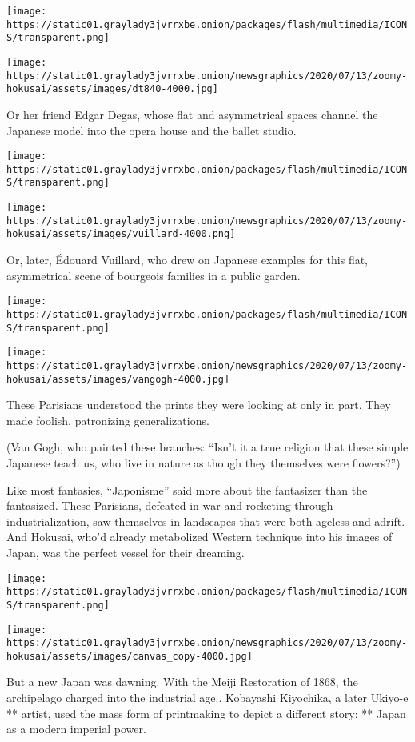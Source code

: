 \texttt{[image: https://static01.graylady3jvrrxbe.onion/packages/flash/multimedia/ICONS/transparent.png]}

\texttt{[image: https://static01.graylady3jvrrxbe.onion/newsgraphics/2020/07/13/zoomy-hokusai/assets/images/dt840-4000.jpg]}

Or her friend Edgar Degas, whose flat and asymmetrical spaces channel
the Japanese model into the opera house and the ballet studio.

\texttt{[image: https://static01.graylady3jvrrxbe.onion/packages/flash/multimedia/ICONS/transparent.png]}

\texttt{[image: https://static01.graylady3jvrrxbe.onion/newsgraphics/2020/07/13/zoomy-hokusai/assets/images/vuillard-4000.png]}

Or, later, Édouard Vuillard, who drew on Japanese examples for this
flat, asymmetrical scene of bourgeois families in a public garden.

\texttt{[image: https://static01.graylady3jvrrxbe.onion/packages/flash/multimedia/ICONS/transparent.png]}

\texttt{[image: https://static01.graylady3jvrrxbe.onion/newsgraphics/2020/07/13/zoomy-hokusai/assets/images/vangogh-4000.jpg]}

These Parisians understood the prints they were looking at only in part.
They made foolish, patronizing generalizations.

(Van Gogh, who painted these branches: ``Isn't it a true religion that
these simple Japanese teach us, who live in nature as though they
themselves were flowers?'')

Like most fantasies, ``Japonisme'' said more about the fantasizer than
the fantasized. These Parisians, defeated in war and rocketing through
industrialization, saw themselves in landscapes that were both ageless
and adrift. And Hokusai, who'd already metabolized Western technique
into his images of Japan, was the perfect vessel for their dreaming.

\texttt{[image: https://static01.graylady3jvrrxbe.onion/packages/flash/multimedia/ICONS/transparent.png]}

\texttt{[image: https://static01.graylady3jvrrxbe.onion/newsgraphics/2020/07/13/zoomy-hokusai/assets/images/canvas\_copy-4000.jpg]}

But a new Japan was dawning. With the Meiji Restoration of 1868, the
archipelago charged into the industrial age.. Kobayashi Kiyochika, a
later Ukiyo-e ** artist, used the mass form of printmaking to depict a
different story: ** Japan as a modern imperial power.

